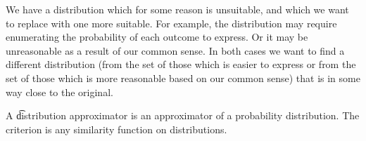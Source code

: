

We have a distribution which for some reason is unsuitable, and which we want to replace with one more suitable.
For example, the distribution may require enumerating the probability of each outcome to express.
Or it may be unreasonable as a result of our common sense.
In both cases we want to find a different distribution (from the set of those which is easier to express or from the set of those which is more reasonable based on our common sense) that is in some way close to the original.


A \t{distribution approximator} is an approximator of a probability distribution.
The criterion is any similarity function on distributions.
